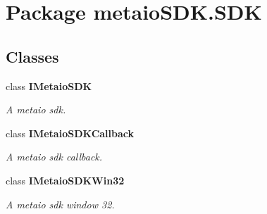 \section{Package metaio\-S\-D\-K.\-S\-D\-K}
\label{namespacemetaio_s_d_k_1_1_s_d_k}
\subsection*{Classes}
\begin{DoxyCompactItemize}
\item 
class {\bf I\-Metaio\-S\-D\-K}
\begin{DoxyCompactList}\small\item\em A metaio sdk. \end{DoxyCompactList}\item 
class {\bf I\-Metaio\-S\-D\-K\-Callback}
\begin{DoxyCompactList}\small\item\em A metaio sdk callback. \end{DoxyCompactList}\item 
class {\bf I\-Metaio\-S\-D\-K\-Win32}
\begin{DoxyCompactList}\small\item\em A metaio sdk window 32. \end{DoxyCompactList}\end{DoxyCompactItemize}
